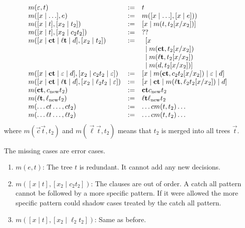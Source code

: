 $$
\begin{array}{lll}
    m(\varepsilon, t)
    &:=&
    t
    \\
    m([x \mid \ldots], e)
    &:=&
    m([x \mid \ldots], [x \mid e]))
    \\
    m([x \mid t], [x_2 \mid t_2])
    &:=&
    [x \mid m(t, t_2[x/x_2])]
    \\
    m([x \mid t], [x_2 \mid c_2 t_2 ])
    &:=&
    ??
    \\
    m([x \mid \vec c \vec t \mid \vec \ell \vec t \mid d], [x_2 \mid t_2])
    &:=&
    \begin{array}[t]{l}
        [x
        \\
        \mid m(\vec c \vec t, t_2[x/x_2])
        \\
        \mid m(\vec \ell \vec t, t_2[x/x_2])
        \\
        \mid m(d, t_2[x/x_2])
        ]
    \end{array}
    \\
    m([x \mid \vec c \vec t \mid \varepsilon \mid d],
        [x_2 \mid c_2 t_2 \mid \varepsilon])
    &:=&
    [x \mid m(\vec c \vec t, c_2 t_2[x/x_2]) \mid \varepsilon \mid d]
    \\
    m([x \mid \vec c \vec t \mid \vec \ell \vec t \mid d],
        [x_2 \mid \ell_2 t_2 \mid \varepsilon])
    &:=&
    [x \mid \vec c \vec t \mid m(\vec \ell \vec t, \ell_2 t_2[x/x_2]) \mid d]
    \\
    m(\vec c \vec t, c_\text{new} t_2)
    &:=&
    \vec c \vec t c_{\text{new}} t_2
    \\
    m(\vec \vec \ell \vec t, \ell_\text{new} t_2)
    &:=&
    \vec \ell \vec t \ell_{\text{new}} t_2
    \\
    m(\ldots ct \ldots, c t_2)
    &:=&
    \ldots c m(t,t_2) \ldots
    \\
    m(\ldots \ell t \ldots, \ell t_2)
    &:=&
    \ldots c m(t,t_2) \ldots
\end{array}
$$
%
where $m(\vec c \vec t, t_2)$ and $m(\vec \ell \vec t, t_2)$ means that $t_2$ is
merged into all trees $\vec t$.

The missing cases are error cases.
%
\begin{enumerate}
    \item $m(e, t)$: The tree $t$ is redundant. It cannot add any new decisions.

    \item $m([x \mid t], [x_2 \mid c_2 t_2 ])$: The clauses are out of order. A
        catch all pattern cannot be followed by a more specific pattern. If it
        were allowed the more specific pattern could shadow cases treated by the
        catch all pattern.

    \item $m([x \mid t], [x_2 \mid \ell_2 t_2 ])$: Same as before.
\end{enumerate}


